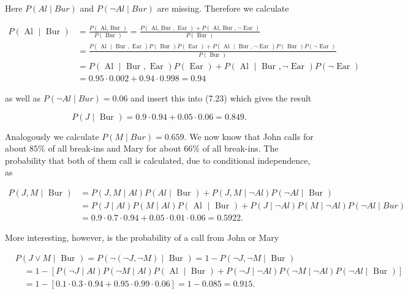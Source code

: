 \documentclass[10pt]{article}
\begin{document}
Here $P(A l \mid B u r)$ and $P(\neg A l \mid B u r)$ are missing. Therefore we calculate

$$
\begin{aligned}
P(\text { Al } \mid \text { Bur }) & =\frac{P(\text { Al, Bur })}{P(\text { Bur })}=\frac{P(\text { Al, Bur }, \text { Ear })+P(\text { Al, Bur }, \neg \text { Ear })}{P(\text { Bur })} \\
& =\frac{P(\text { Al } \mid \text { Bur }, \text { Ear }) P(\text { Bur }) P(\text { Ear })+P(\text { Al } \mid \text { Bur }, \neg \text { Ear }) P(\text { Bur }) P(\neg \text { Ear })}{P(\text { Bur })} \\
& =P(\text { Al } \mid \text { Bur }, \text { Ear }) P(\text { Ear })+P(\text { Al } \mid \text { Bur }, \neg \text { Ear }) P(\neg \text { Ear }) \\
& =0.95 \cdot 0.002+0.94 \cdot 0.998=0.94
\end{aligned}
$$

as well as $P(\neg A l \mid B u r)=0.06$ and insert this into (7.23) which gives the result

$$
P(J \mid \text { Bur })=0.9 \cdot 0.94+0.05 \cdot 0.06=0.849 .
$$

Analogously we calculate $P(M \mid B u r)=0.659$. We now know that John calls for about $85 \%$ of all break-ins and Mary for about $66 \%$ of all break-ins. The probability that both of them call is calculated, due to conditional independence, as

$$
\begin{aligned}
P(J, M \mid \text { Bur }) & =P(J, M \mid A l) P(A l \mid \text { Bur })+P(J, M \mid \neg A l) P(\neg A l \mid \text { Bur }) \\
& =P(J \mid A l) P(M \mid A l) P(\text { Al } \mid \text { Bur })+P(J \mid \neg A l) P(M \mid \neg A l) P(\neg A l \mid B u r) \\
& =0.9 \cdot 0.7 \cdot 0.94+0.05 \cdot 0.01 \cdot 0.06=0.5922 .
\end{aligned}
$$

More interesting, however, is the probability of a call from John or Mary

$$
\begin{aligned}
& P(J \vee M \mid \text { Bur })=P(\neg(\neg J, \neg M) \mid \text { Bur })=1-P(\neg J, \neg M \mid \text { Bur }) \\
& \quad=1-[P(\neg J \mid A l) P(\neg M \mid A l) P(\text { Al } \mid \text { Bur })+P(\neg J \mid \neg A l) P(\neg M \mid \neg A l) P(\neg A l \mid \text { Bur })] \\
& \quad=1-[0.1 \cdot 0.3 \cdot 0.94+0.95 \cdot 0.99 \cdot 0.06]=1-0.085=0.915 .
\end{aligned}
$$
\end{document}
